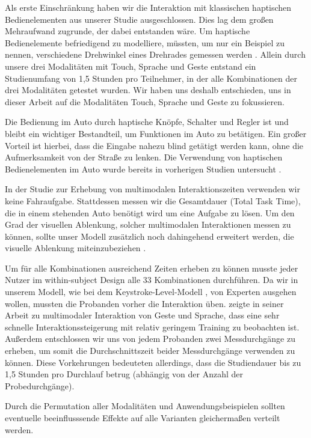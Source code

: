 Als erste Einschränkung haben wir die Interaktion mit klassischen haptischen Bedienelementen aus unserer Studie ausgeschlossen.
Dies lag dem großen Mehraufwand zugrunde, der dabei entstanden wäre.
Um haptische Bedienelemente befriedigend zu modelliere, müssten, um nur ein Beispiel zu nennen, verschiedene Drehwinkel eines Drehrades gemessen werden \citep{schneegass_2009}.
Allein durch unsere drei Modalitäten mit Touch, Sprache und Geste entstand ein Studienumfang von 1,5 Stunden pro Teilnehmer, in der alle Kombinationen der drei Modalitäten getestet wurden.
Wir haben uns deshalb entschieden, uns in dieser Arbeit auf die Modalitäten Touch, Sprache und Geste zu fokussieren.

Die Bedienung im Auto durch haptische Knöpfe, Schalter und Regler ist und bleibt ein wichtiger Bestandteil, um Funktionen im Auto zu betätigen.
Ein großer Vorteil ist hierbei, dass die Eingabe nahezu blind getätigt werden kann, ohne die Aufmerksamkeit von der Straße zu lenken.
Die Verwendung von haptischen Bedienelementen im Auto wurde bereits in vorherigen Studien untersucht \citep{Pettitt_2007,schneegass_2009,SchneegaB_2011}.

In der Studie zur Erhebung von multimodalen Interaktionszeiten verwenden wir keine Fahraufgabe.
Stattdessen messen wir die Gesamtdauer (Total Task Time), die in einem stehenden Auto benötigt wird um eine Aufgabe zu lösen.
Um den Grad der visuellen Ablenkung, solcher multimodalen Interaktionen messen zu können, sollte unser Modell zusätzlich noch dahingehend erweitert werden, die visuelle Ablenkung miteinzubeziehen \citep{Pettitt_2007}.
 
Um für alle Kombinationen ausreichend Zeiten erheben zu können musste jeder Nutzer im within-subject Design alle 33 Kombinationen durchführen.
Da wir in unserem Modell, wie bei dem Keystroke-Level-Modell \citep{Card_1980}, von Experten ausgehen wollen, mussten die Probanden vorher die Interaktion üben.
\citet{Jude:2014} zeigte in seiner Arbeit zu multimodaler Interaktion von Geste und Sprache, dass eine sehr schnelle Interaktionssteigerung mit relativ geringem Training zu beobachten ist.
Außerdem entschlossen wir uns von jedem Probanden zwei Messdurchgänge zu erheben, um somit die Durchschnittszeit beider Messdurchgänge verwenden zu können.
Diese Vorkehrungen bedeuteten allerdings, dass die Studiendauer bis zu 1,5 Stunden pro Durchlauf betrug (abhängig von der Anzahl der Probedurchgänge).

Durch die Permutation aller Modalitäten und Anwendungsbeispielen sollten eventuelle beeinflusssende Effekte auf alle Varianten gleichermaßen verteilt werden.

